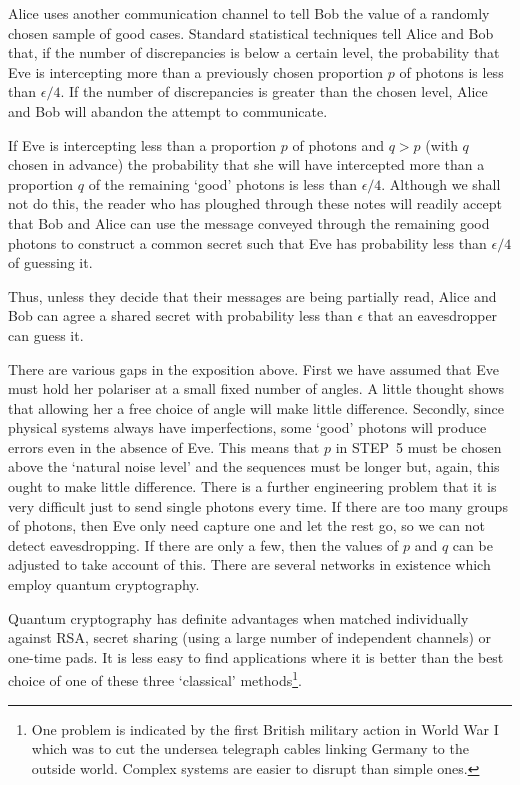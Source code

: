  Alice uses another communication
channel to tell Bob the value of a randomly chosen sample
of good cases. Standard statistical techniques
tell Alice and Bob that, if the number of discrepancies
is below a certain level, the probability that
Eve is intercepting more than a previously 
chosen proportion $p$
of photons is less than $\epsilon/4$.
If the number of discrepancies is greater than the
chosen level, Alice and Bob will abandon 
the  attempt to communicate. 

 If Eve is intercepting less than a proportion $p$
of photons and $q>p$ (with $q$ chosen in advance)
the probability that she will have intercepted more than
a proportion $q$ of the remaining `good' photons is less than $\epsilon/4$.
Although we shall not do this, the reader who has
ploughed through these notes will readily accept that
Bob and Alice can use the message conveyed through the 
remaining good photons to construct 
a common secret such that Eve has probability 
less than $\epsilon/4$ of guessing
it.

Thus, unless they decide that their
messages are being partially read,
Alice and Bob can agree a shared secret
with probability less than $\epsilon$ that
an eavesdropper can guess it.

There are various gaps in the exposition above.
First we have assumed that Eve must hold her polariser
at a small fixed number of angles. A little thought
shows that allowing her a free choice of angle will make
little difference. Secondly, since physical systems
always have imperfections, some `good' photons
will produce errors even in the absence of
Eve. This means that $p$ in STEP~5 must
be chosen above the `natural noise level'
and the sequences must be longer but, again,
this ought to make little difference.
There is a further engineering problem that
it is very difficult just to send single photons
every time. If there are too many groups of photons,
then Eve only need capture one and let the rest go,
so we can not detect eavesdropping. If there are only a few,
then the values of $p$ and $q$ can be adjusted to
take account of this. There are several networks in existence
which employ quantum cryptography.

 
Quantum cryptography has definite advantages when
matched individually against RSA, secret sharing (using a large
number of independent channels) or one-time pads.
It is less easy to find applications where
it is better than the best choice of one of
these three `classical' methods\footnote{One problem
is indicated by the first British military action
in World War I which was to cut the undersea 
telegraph cables linking Germany to the outside world.
Complex systems are easier to disrupt than simple ones.}.


